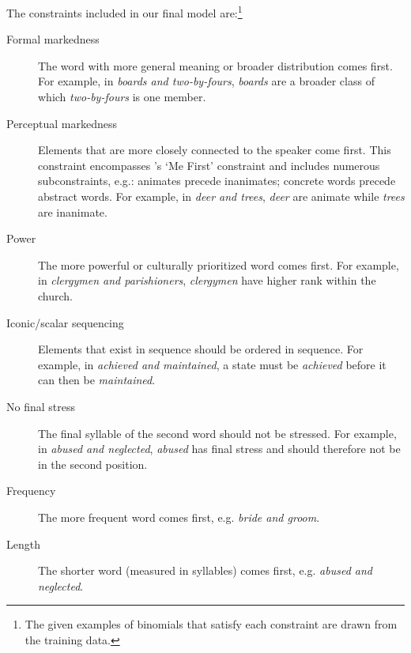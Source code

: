 \documentclass[authoryear]{elsarticle}
\begin{document}
The constraints included in our final model are:\footnote{The given examples of binomials that satisfy each constraint are drawn from the training data.}

\begin{description}
  \item[Formal markedness] The word with more general meaning or broader distribution comes first. For example, in \emph{boards and two-by-fours}, \emph{boards} are a broader class of which \emph{two-by-fours} is one member.
  \item[Perceptual markedness] Elements that are more closely connected to the speaker come first. This constraint encompasses \citeauthor{Cooper:1975uz}'s \citeyearpar{Cooper:1975uz} `Me First' constraint and includes numerous subconstraints, e.g.: animates precede inanimates; concrete words precede abstract words. For example, in \emph{deer and trees}, \emph{deer} are animate while \emph{trees} are inanimate.
  \item[Power] The more powerful or culturally prioritized word comes first. For example, in \emph{clergymen and parishioners}, \emph{clergymen} have higher rank within the church.
  \item[Iconic/scalar sequencing] Elements that exist in sequence should be ordered in sequence. For example, in \emph{achieved and maintained}, a state must be \emph{achieved} before it can then be \emph{maintained}.
  \item[No final stress] The final syllable of the second word should not be stressed. For example, in \emph{abused and neglected}, \emph{abused} has final stress and should therefore not be in the second position.
  \item[Frequency] The more frequent word comes first, e.g. \emph{bride and groom}.
  \item[Length] The shorter word (measured in syllables) comes first, e.g. \emph{abused and neglected}.
  
\end{description}
\end{document}
